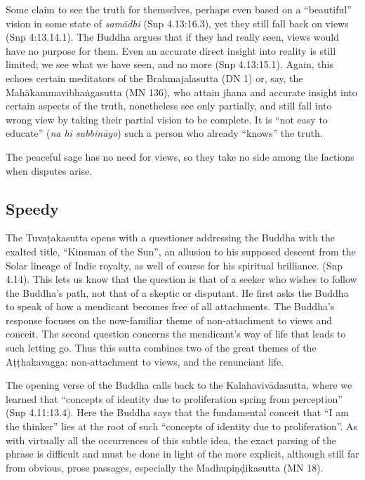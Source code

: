 \documentclass[12pt,openany]{book}%
\begin{document}
Some claim to see the truth for themselves, perhaps even based on a “beautiful” vision in some state of \textit{\textsanskrit{samādhi}} (Snp 4.13:16.3), yet they still fall back on views (Snp 4:13.14.1). The Buddha argues that if they had really seen, views would have no purpose for them. Even an accurate direct insight into reality is still limited; we see what we have seen, and no more (Snp 4.13:15.1). Again, this echoes certain meditators of the Brahmajalasutta (DN 1) or, say, the \textsanskrit{Mahākammavibhaṅgasutta} (MN 136), who attain jhana and accurate insight into certain aspects of the truth, nonetheless see only partially, and still fall into wrong view by taking their partial vision to be complete. It is “not easy to educate” (\textit{na hi \textsanskrit{subbināyo}}) such a person who already “knows” the truth.

The peaceful sage has no need for views, so they take no side among the factions when disputes arise.

\subsection*{Speedy}

The \textsanskrit{Tuvaṭakasutta} opens with a questioner addressing the Buddha with the exalted title, “Kinsman of the Sun”, an allusion to his supposed descent from the Solar lineage of Indic royalty, as well of course for his spiritual brilliance. (Snp 4.14). This lets us know that the question is that of a seeker who wishes to follow the Buddha’s path, not that of a skeptic or disputant. He first asks the Buddha to speak of how a mendicant becomes free of all attachments. The Buddha’s response focuses on the now-familiar theme of non-attachment to views and conceit. The second question concerns the mendicant’s way of life that leads to such letting go. Thus this sutta combines two of the great themes of the \textsanskrit{Aṭṭhakavagga}: non-attachment to views, and the renunciant life.

The opening verse of the Buddha calls back to the \textsanskrit{Kalahavivādasutta}, where we learned that “concepts of identity due to proliferation spring from perception” (Snp 4.11:13.4). Here the Buddha says that the fundamental conceit that “I am the thinker” lies at the root of such “concepts of identity due to proliferation”. As with virtually all the occurrences of this subtle idea, the exact parsing of the phrase is difficult and must be done in light of the more explicit, although still far from obvious, prose passages, especially the \textsanskrit{Madhupiṇḍikasutta} (MN 18).
\end{document}
